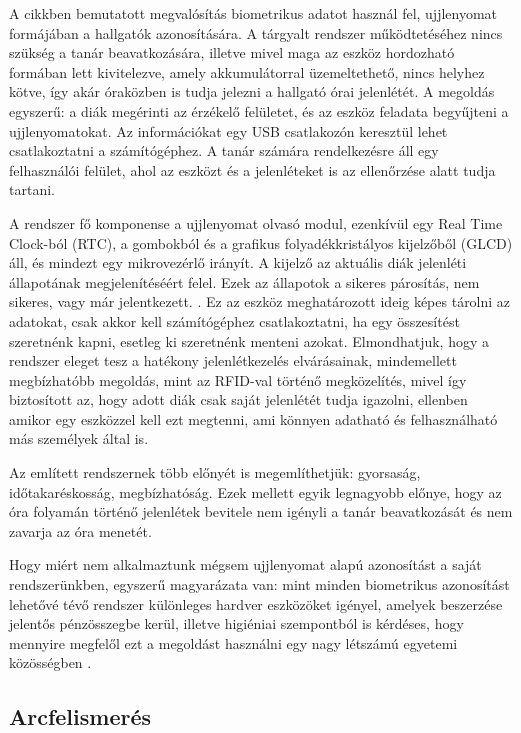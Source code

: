 A \cite{4} cikkben bemutatott megvalósítás biometrikus adatot használ fel, ujjlenyomat formájában a hallgatók azonosítására. A tárgyalt rendszer működtetéséhez nincs szükség a tanár beavatkozására, illetve mivel maga az eszköz hordozható formában lett kivitelezve, amely akkumulátorral üzemeltethető, nincs helyhez kötve, így akár óraközben is tudja jelezni a hallgató órai jelenlétét. A megoldás egyszerű: a diák megérinti az érzékelő felületet, és az eszköz feladata begyűjteni a ujjlenyomatokat. Az információkat egy USB csatlakozón keresztül lehet csatlakoztatni a számítógéphez. A tanár számára rendelkezésre áll egy felhasználói felület, ahol az eszközt és a jelenléteket is az ellenőrzése alatt tudja tartani.

A rendszer fő komponense a ujjlenyomat olvasó modul, ezenkívül egy Real Time Clock-ból (RTC), a gombokból és a grafikus folyadékkristályos kijelzőből (GLCD) áll, és mindezt egy mikrovezérlő irányít. A kijelző az aktuális diák jelenléti állapotának megjelenítéséért felel. Ezek az állapotok a sikeres párosítás, nem sikeres, vagy már jelentkezett. \cite{4}.
Ez az eszköz meghatározott ideig képes tárolni az adatokat, csak akkor kell számítógéphez csatlakoztatni, ha egy összesítést szeretnénk kapni, esetleg ki szeretnénk menteni azokat.
Elmondhatjuk, hogy a rendszer eleget tesz a hatékony jelenlétkezelés elvárásainak, mindemellett megbízhatóbb megoldás, mint az RFID-val történő megközelítés, mivel így biztosított az, hogy adott diák csak saját jelenlétét tudja igazolni, ellenben amikor egy eszközzel kell ezt megtenni, ami könnyen adatható és felhasználható más személyek által is.

Az említett rendszernek több előnyét is megemlíthetjük: gyorsaság, időtakaréskosság, megbízhatóság. Ezek mellett egyik legnagyobb előnye, hogy az óra folyamán történő jelenlétek bevitele nem igényli a tanár beavatkozását és nem zavarja az óra menetét.

Hogy miért nem alkalmaztunk mégsem ujjlenyomat alapú azonosítást a saját rendszerünkben, egyszerű magyarázata van: mint minden biometrikus azonosítást lehetővé tévő rendszer különleges hardver eszközöket igényel, amelyek beszerzése jelentős pénzösszegbe kerül, illetve higiéniai szempontból is kérdéses, hogy mennyire megfelől ezt a megoldást használni egy nagy létszámú egyetemi közösségben \cite{6}. 

\subsection{Arcfelismerés}

